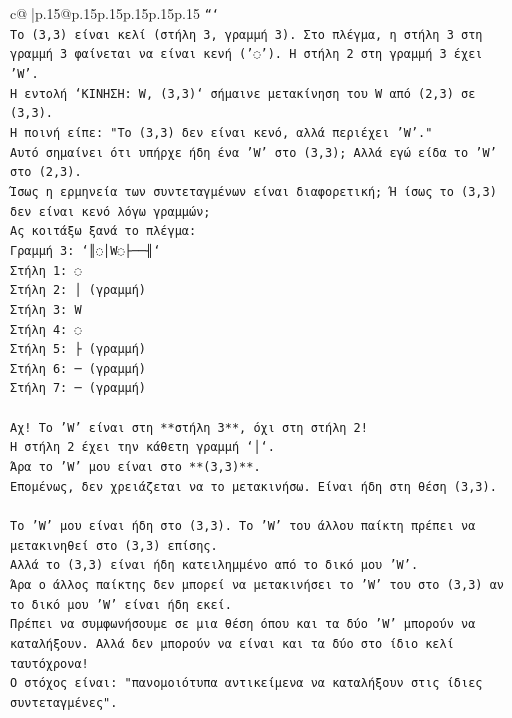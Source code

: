 \documentclass{article}
\begin{document}
{\begin{supertabular}{c@{$\;$}|p{.15\linewidth}@{}p{.15\linewidth}p{.15\linewidth}p{.15\linewidth}p{.15\linewidth}p{.15\linewidth}}
{{{\texttt{```} \\
\texttt{Το (3,3) είναι κελί (στήλη 3, γραμμή 3). Στο πλέγμα, η στήλη 3 στη γραμμή 3 φαίνεται να είναι κενή ('◌'). Η στήλη 2 στη γραμμή 3 έχει 'W'.} \\
\texttt{Η εντολή `ΚΙΝΗΣΗ: W, (3,3)` σήμαινε μετακίνηση του W από (2,3) σε (3,3).} \\
\texttt{Η ποινή είπε: "Το (3,3) δεν είναι κενό, αλλά περιέχει 'W'."} \\
\texttt{Αυτό σημαίνει ότι υπήρχε ήδη ένα 'W' στο (3,3); Αλλά εγώ είδα το 'W' στο (2,3).} \\
\texttt{Ίσως η ερμηνεία των συντεταγμένων είναι διαφορετική; Ή ίσως το (3,3) δεν είναι κενό λόγω γραμμών;} \\
\texttt{Ας κοιτάξω ξανά το πλέγμα:} \\
\texttt{Γραμμή 3: `║◌│W◌├──╢`} \\
\texttt{Στήλη 1: ◌} \\
\texttt{Στήλη 2: │ (γραμμή)} \\
\texttt{Στήλη 3: W} \\
\texttt{Στήλη 4: ◌} \\
\texttt{Στήλη 5: ├ (γραμμή)} \\
\texttt{Στήλη 6: ─ (γραμμή)} \\
\texttt{Στήλη 7: ─ (γραμμή)} \\
\\ 
\texttt{Αχ! Το 'W' είναι στη **στήλη 3**, όχι στη στήλη 2!} \\
\texttt{Η στήλη 2 έχει την κάθετη γραμμή `│`.} \\
\texttt{Άρα το 'W' μου είναι στο **(3,3)**.} \\
\texttt{Επομένως, δεν χρειάζεται να το μετακινήσω. Είναι ήδη στη θέση (3,3).} \\
\\ 
\texttt{Το 'W' μου είναι ήδη στο (3,3). Το 'W' του άλλου παίκτη πρέπει να μετακινηθεί στο (3,3) επίσης.} \\
\texttt{Αλλά το (3,3) είναι ήδη κατειλημμένο από το δικό μου 'W'.} \\
\texttt{Άρα ο άλλος παίκτης δεν μπορεί να μετακινήσει το 'W' του στο (3,3) αν το δικό μου 'W' είναι ήδη εκεί.} \\
\texttt{Πρέπει να συμφωνήσουμε σε μια θέση όπου και τα δύο 'W' μπορούν να καταλήξουν. Αλλά δεν μπορούν να είναι και τα δύο στο ίδιο κελί ταυτόχρονα!} \\
\texttt{Ο στόχος είναι: "πανομοιότυπα αντικείμενα να καταλήξουν στις ίδιες συντεταγμένες".} \\
}}}
\end{supertabular}}
\end{document}
